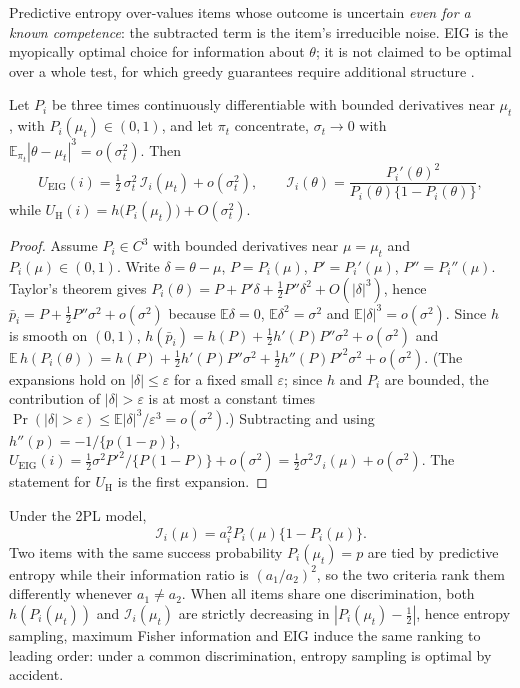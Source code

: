 Predictive entropy over-values items whose outcome is uncertain \emph{even for a known
competence}: the subtracted term is the item's irreducible noise. EIG is the myopically
optimal choice for information about $\theta$; it is not claimed to be optimal over a
whole test, for which greedy guarantees require additional structure
\citep{golovin2011adaptive}.

\begin{proposition}\label{prop:local}
Let $P_i$ be three times continuously differentiable with bounded derivatives
near $\mu_t$, with $P_i(\mu_t)\in(0,1)$, and let $\pi_t$ concentrate,
$\sigma_t\to0$ with $\mathbb E_{\pi_t}|\theta-\mu_t|^3=o(\sigma_t^2)$. Then
\begin{equation}
U_{\mathrm{EIG}}(i)=\tfrac12\,\sigma_t^2\,\mathcal I_i(\mu_t)+o(\sigma_t^2),
\qquad \mathcal I_i(\theta)=\frac{P_i'(\theta)^2}{P_i(\theta)\{1-P_i(\theta)\}},
\end{equation}
while $U_{\mathrm H}(i)=h\big(P_i(\mu_t)\big)+O(\sigma_t^2)$.
\end{proposition}

\begin{proof}
Assume $P_i\in C^3$ with bounded derivatives near $\mu=\mu_t$ and $P_i(\mu)\in(0,1)$.
Write $\delta=\theta-\mu$, $P=P_i(\mu)$, $P'=P_i'(\mu)$, $P''=P_i''(\mu)$. Taylor's
theorem gives $P_i(\theta)=P+P'\delta+\frac12P''\delta^2+O(|\delta|^3)$, hence
$\bar p_i=P+\frac12P''\sigma^2+o(\sigma^2)$ because $\mathbb E\delta=0$,
$\mathbb E\delta^2=\sigma^2$ and $\mathbb E|\delta|^3=o(\sigma^2)$. Since $h$ is smooth on
$(0,1)$, $h(\bar p_i)=h(P)+\frac12h'(P)P''\sigma^2+o(\sigma^2)$ and
$\mathbb E\,h(P_i(\theta))=h(P)+\frac12h'(P)P''\sigma^2+\frac12h''(P)P'^2\sigma^2+o(\sigma^2)$.
(The expansions hold on $|\delta|\le\varepsilon$ for a fixed small $\varepsilon$; since $h$
and $P_i$ are bounded, the contribution of $|\delta|>\varepsilon$ is at most a constant
times $\Pr(|\delta|>\varepsilon)\le\mathbb E|\delta|^3/\varepsilon^3=o(\sigma^2)$.)
Subtracting and using $h''(p)=-1/\{p(1-p)\}$,
$U_{\mathrm{EIG}}(i)=\frac12\sigma^2P'^2/\{P(1-P)\}+o(\sigma^2)=\frac12\sigma^2\mathcal I_i(\mu)+o(\sigma^2)$.
The statement for $U_{\mathrm H}$ is the first expansion.
\end{proof}

\begin{corollary}\label{cor:blind}
Under the 2PL model,
\[
\mathcal I_i(\mu)=a_i^2P_i(\mu)\{1-P_i(\mu)\}.
\]
Two items
with the same success probability $P_i(\mu_t)=p$ are tied by predictive entropy
while their information ratio is $(a_1/a_2)^2$, so the two criteria rank them
differently whenever $a_1\neq a_2$. When all items share one discrimination, both
$h(P_i(\mu_t))$ and $\mathcal I_i(\mu_t)$ are strictly decreasing in
$|P_i(\mu_t)-\tfrac12|$, hence entropy sampling, maximum Fisher information and EIG
induce the same ranking to leading order: under a common discrimination, entropy
sampling is optimal by accident.
\end{corollary}

